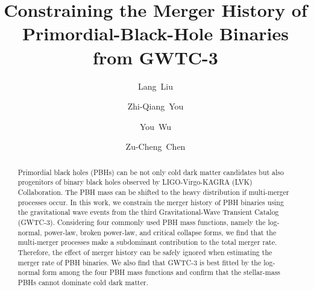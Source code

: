\documentclass[
reprint,           %
superscriptaddress,%
amsmath,           %
amssymb,           %
aps,               %
prd,               %
notitlepage,       %
longbibliography,  %
floatfix,          %
nofootinbib,
]{revtex4-1}
\begin{document}
	
\title{Constraining the Merger History of Primordial-Black-Hole Binaries from GWTC-3}
	
\author{Lang~Liu}


\author{Zhi-Qiang~You}

\author{You~Wu}

\author{Zu-Cheng~Chen}

	
\begin{abstract}
Primordial black holes (PBHs) can be not only cold dark matter candidates but also progenitors of binary black holes observed by LIGO-Virgo-KAGRA (LVK) Collaboration. The PBH mass can be shifted to the heavy distribution if multi-merger processes occur. In this work, we constrain the merger history of PBH binaries using the gravitational wave events from the third Gravitational-Wave Transient Catalog (GWTC-3). Considering four commonly used PBH mass functions, namely the log-normal, power-law, broken power-law, and critical collapse forms, we find that the multi-merger processes make a subdominant contribution to the total merger rate. Therefore, the effect of merger history can be safely ignored when estimating the merger rate of PBH binaries. We also find that GWTC-3 is best fitted by the log-normal form among the four PBH mass functions and confirm that the stellar-mass PBHs cannot dominate cold dark matter.
\end{abstract}
	
\end{document}
